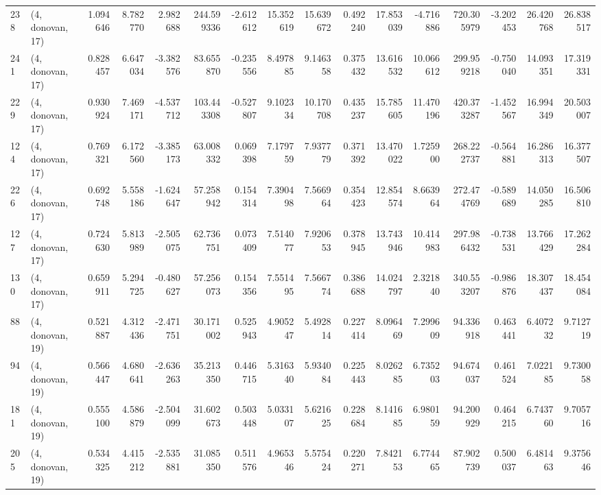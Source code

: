 \begin{tabular}{llrrrrrrrrrrrrrr}
238 &  (4, donovan, 17) &   1.094646 &   8.782770 &  2.982688 &  244.599336 & -2.612612 &  15.352619 &  15.639672 &  0.492240 &  17.853039 &  -4.716886 &  720.305979 & -3.202453 &  26.420768 &  26.838517 \\
241 &  (4, donovan, 17) &   0.828457 &   6.647034 & -3.382576 &   83.655870 & -0.235556 &   8.497885 &   9.146358 &  0.375432 &  13.616532 &  10.066612 &  299.959218 & -0.750040 &  14.093351 &  17.319331 \\
229 &  (4, donovan, 17) &   0.930924 &   7.469171 & -4.537712 &  103.443308 & -0.527807 &   9.102334 &  10.170708 &  0.435237 &  15.785605 &  11.470196 &  420.373287 & -1.452567 &  16.994349 &  20.503007 \\
124 &  (4, donovan, 17) &   0.769321 &   6.172560 & -3.385173 &   63.008332 &  0.069398 &   7.179759 &   7.937779 &  0.371392 &  13.470022 &   1.725900 &  268.222737 & -0.564881 &  16.286313 &  16.377507 \\
226 &  (4, donovan, 17) &   0.692748 &   5.558186 & -1.624647 &   57.258942 &  0.154314 &   7.390498 &   7.566964 &  0.354423 &  12.854574 &   8.663964 &  272.474769 & -0.589689 &  14.050285 &  16.506810 \\
127 &  (4, donovan, 17) &   0.724630 &   5.813989 & -2.505075 &   62.736751 &  0.073409 &   7.514077 &   7.920653 &  0.378945 &  13.743946 &  10.414983 &  297.986432 & -0.738531 &  13.766429 &  17.262284 \\
130 &  (4, donovan, 17) &   0.659911 &   5.294725 & -0.480627 &   57.256073 &  0.154356 &   7.551495 &   7.566774 &  0.386688 &  14.024797 &   2.321840 &  340.553207 & -0.986876 &  18.307437 &  18.454084 \\
88  &  (4, donovan, 19) &   0.521887 &   4.312436 & -2.471751 &   30.171002 &  0.525943 &   4.905247 &   5.492814 &  0.227414 &   8.096469 &   7.299609 &   94.336918 &  0.463441 &   6.407232 &   9.712719 \\
94  &  (4, donovan, 19) &   0.566447 &   4.680641 & -2.636263 &   35.213350 &  0.446715 &   5.316340 &   5.934084 &  0.225443 &   8.026285 &   6.735203 &   94.674037 &  0.461524 &   7.022185 &   9.730058 \\
181 &  (4, donovan, 19) &   0.555100 &   4.586879 & -2.504099 &   31.602673 &  0.503448 &   5.033107 &   5.621625 &  0.228684 &   8.141685 &   6.980159 &   94.200929 &  0.464215 &   6.743760 &   9.705716 \\
205 &  (4, donovan, 19) &   0.534325 &   4.415212 & -2.535881 &   31.085350 &  0.511576 &   4.965346 &   5.575424 &  0.220271 &   7.842153 &   6.774465 &   87.902739 &  0.500037 &   6.481463 &   9.375646 \\

\end{tabular}
